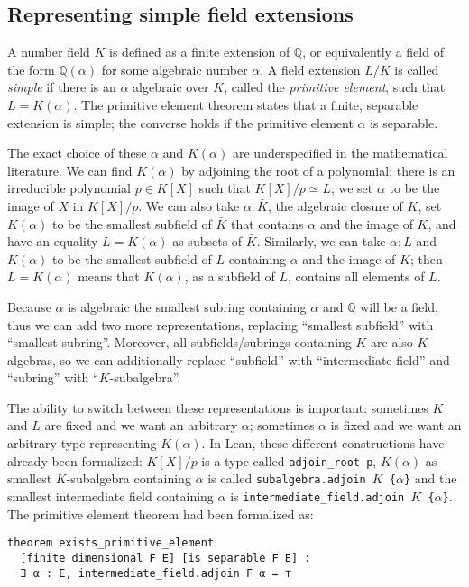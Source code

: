 \documentclass[a4paper,USenglish,cleveref, autoref, thm-restate]{lipics-v2021}
\newcommand{\lean}[1]{\texttt{#1}\xspace} %
\newcommand{\Q}{\mathbb{Q}}
\begin{document}
\subsection{Representing simple field extensions}

A number field $K$ is defined as a finite extension of $\Q$, or equivalently a field of the form $\Q(\alpha)$ for some algebraic number $\alpha$.
A field extension $L / K$ is called \emph{simple} if there is an $\alpha$ algebraic over $K$, called the \emph{primitive element}, such that $L = K(\alpha)$.
The primitive element theorem states that a finite, separable extension is simple; the converse holds if the primitive element $\alpha$ is separable.

The exact choice of these $\alpha$ and $K(\alpha)$ are underspecified in the mathematical literature.
We can find $K(\alpha)$ by adjoining the root of a polynomial: there is an irreducible polynomial $p \in K[X]$ such that $K[X] / p \simeq L$; we set $\alpha$ to be the image of $X$ in $K[X] / p$.
We can also take $\alpha : \bar{K}$, the algebraic closure of $K$, set $K(\alpha)$ to be the smallest subfield of $\bar{K}$ that contains $\alpha$ and the image of $K$, and have an equality $L = K(\alpha)$ as subsets of $\bar{K}$.
Similarly, we can take $\alpha : L$ and $K(\alpha)$ to be the smallest subfield of $L$ containing $\alpha$ and the image of $K$; then $L = K(\alpha)$ means that $K(\alpha)$, as a subfield of $L$, contains all elements of $L$.

Because $\alpha$ is algebraic the smallest subring containing $\alpha$ and $\Q$ will be a field, thus we can add two more representations, replacing ``smallest subfield'' with ``smallest subring''.
Moreover, all subfields/subrings containing $K$ are also $K$-algebras, so we can additionally replace ``subfield'' with ``intermediate field'' and ``subring'' with ``$K$-subalgebra''.

The ability to switch between these representations is important: sometimes $K$ and $L$ are fixed and we want an arbitrary $\alpha$; sometimes $\alpha$ is fixed and we want an arbitrary type representing $K(\alpha)$.
In Lean, these different constructions have already been formalized:
$K[X] / p$ is a type called \lean{adjoin\_root p},
$K(\alpha)$ as smallest $K$-subalgebra containing $\alpha$ is called \lean{subalgebra.adjoin $K$ \{$\alpha$\}}
and the smallest intermediate field containing $\alpha$ is \lean{intermediate\-\_field.adjoin $K$ \{$\alpha$\}}.
The primitive element theorem had been formalized as:
\begin{lstlisting}
theorem exists_primitive_element
  [finite_dimensional F E] [is_separable F E] :
  ∃ α : E, intermediate_field.adjoin F α = ⊤
\end{lstlisting}
\end{document}
